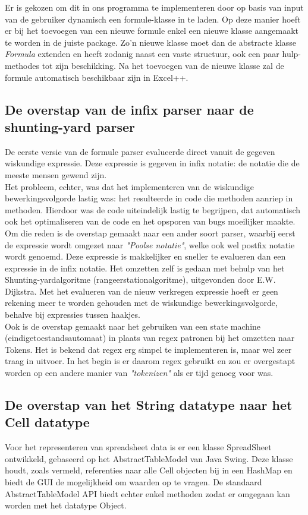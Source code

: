 \documentclass[a4paper,11pt]{article}
\begin{document}
Er is gekozen om dit in ons programma te implementeren door op basis van input van de gebruiker dynamisch een formule-klasse in te laden. Op deze manier hoeft er bij het toevoegen van een nieuwe formule enkel een nieuwe klasse aangemaakt te worden in de juiste package. Zo'n nieuwe klasse moet dan de abstracte klasse \textit{Formula} extenden en heeft zodanig naast een vaste structuur, ook een paar hulp-methodes tot zijn beschikking. Na het toevoegen van de nieuwe klasse zal de formule automatisch beschikbaar zijn in Excel++.\\

\subsection{De overstap van de infix parser naar de shunting-yard parser}
De eerste versie van de formule parser evalueerde direct vanuit de gegeven wiskundige expressie. Deze expressie is gegeven in infix notatie: de notatie die de meeste mensen gewend zijn.\\

Het probleem, echter, was dat het implementeren van de wiskundige bewerkingsvolgorde lastig was: het resulteerde in code die methoden aanriep in methoden. Hierdoor was de code uiteindelijk lastig te begrijpen, dat automatisch ook het optimaliseren van de code en het opsporen van bugs moeilijker maakte.\\ Om die reden is de overstap gemaakt naar een ander soort parser, waarbij eerst de expressie wordt omgezet naar \textit{"Poolse notatie"}, welke ook wel postfix notatie wordt genoemd. Deze expressie is makkelijker en sneller te evalueren dan een expressie in de infix notatie. Het omzetten zelf is gedaan met behulp van het Shunting-yardalgoritme (rangeerstationalgoritme), uitgevonden door E.W. Dijkstra. Met het evalueren van de nieuw verkregen expressie hoeft er geen rekening meer te worden gehouden met de wiskundige bewerkingsvolgorde, behalve bij expressies tussen haakjes.\\

Ook is de overstap gemaakt naar het gebruiken van een state machine (eindigetoestandsautomaat) in plaats van regex patronen bij het omzetten naar Tokens. Het is bekend dat regex erg simpel te implementeren is, maar wel zeer traag in uitvoer. In het begin is er daarom regex gebruikt en zou er overgestapt worden op een andere manier van \textit{"tokenizen"} als er tijd genoeg voor was.

\subsection{De overstap van het String datatype naar het Cell datatype}
Voor het representeren van spreadsheet data is er een klasse SpreadSheet ontwikkeld, gebaseerd op het AbstractTableModel van Java Swing. Deze klasse houdt, zoals vermeld, referenties naar alle Cell objecten bij in een HashMap en biedt de GUI de mogelijkheid om waarden op te vragen. De standaard AbstractTableModel API biedt echter enkel methoden zodat er omgegaan kan worden met het datatype Object.\\
\end{document}
